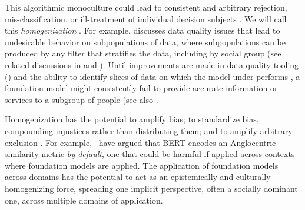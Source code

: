 This algorithmic monoculture \citep{kleinberg2021} could lead to consistent and arbitrary rejection, mis-classification, or ill-treatment of individual decision subjects \citep{Gandy2021}. 
We will call this \textit{homogenization} \citep{creel2021}.  
For example,  discusses data quality issues that lead to undesirable behavior on subpopulations of data, where subpopulations can be produced by any filter that stratifies the data, including by social group  (see related discussions in  and ). 
Until improvements are made in data quality tooling () and the ability to identify slices of data on which the model under-performs  \citep{chung2019slice, goel2021robustnessgym}, 
a foundation model might consistently fail to provide accurate information or services to a subgroup of people (see also .  

Homogenization has the potential to amplify bias; to standardize bias, compounding injustices rather than distributing them; and to amplify arbitrary exclusion \citep{creel2021, Gandy2021}. 
For example,~\citet{zhou2021} have argued that BERT encodes an Anglocentric similarity metric \textit{by default}, one that could be harmful if applied across contexts where foundation models are applied. 
The application of foundation models across domains has the potential to act as an epistemically and culturally homogenizing force, spreading one implicit perspective, often a socially dominant one, across multiple domains of application. 

